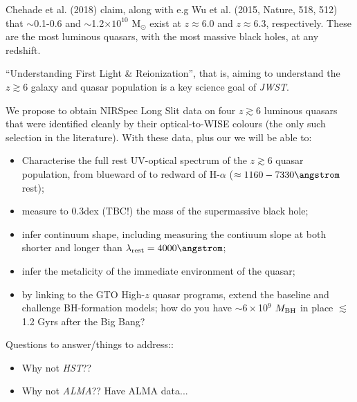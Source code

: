\smallskip
\smallskip
\noindent
Chehade et al. (2018) claim, along with e.g Wu et al. (2015, Nature,
518, 512) that $\sim$0.1-0.6 and $\sim$1.2$\times 10^{10}$ M$_{\odot}$
exist at $z\approx6.0$ and $z\approx6.3$, respectively. These are the
most luminous quasars, with the most massive black holes, at any
redshift.

\smallskip
\smallskip
\noindent
``Understanding First Light \& Reionization'', that is, aiming to
understand the $z \gtrsim 6$ galaxy and quasar population is a key
science goal of {\it JWST}.

\smallskip
\smallskip
\noindent
We propose to obtain NIRSpec Long Slit
data on four $z\gtrsim 6$ luminous quasars that were identified
cleanly by their optical-to-WISE colours (the only such selection in
the literature). With these data, plus our we will be able to:
\begin{itemize}
\item Characterise the full rest UV-optical spectrum of the
$z\gtrsim6$ quasar population, from blueward of \lya to redward of
H-$\alpha$ ($\approx 1160 - 7330 \angstrom$ rest);
\item measure to 0.3dex (TBC!) the mass of the supermassive black
hole;
\item infer continuum shape, including measuring the contiuum slope at
both shorter and longer than $\lambda_{\rm rest} = 4000 \angstrom$;
\item infer the metalicity of the immediate environment of the quasar;
\item by linking to the GTO High-$z$ quasar programs, extend the
baseline and challenge BH-formation models; how do you have $\sim
6\times$10$^9$ $M_{\rm BH}$ in place $\lesssim$1.2 Gyrs after the Big
Bang?
\end{itemize}





\smallskip
\smallskip
\noindent
Questions to answer/things to address:: 
\begin{itemize}
\item Why not {\it HST}??
  \item Why not {\it ALMA}?? Have ALMA data...
\end{itemize}


